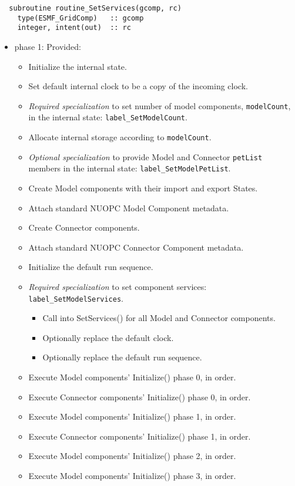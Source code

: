\begin{verbatim}  subroutine routine_SetServices(gcomp, rc)
    type(ESMF_GridComp)   :: gcomp
    integer, intent(out)  :: rc
\end{verbatim}

\begin{itemize}
\item phase 1: {\sc Provided:}
  \begin{itemize}
  \item Initialize the internal state.
  \item Set default internal clock to be a copy of the incoming clock.
  \item {\it Required specialization} to set number of model components, {\tt modelCount}, in the internal state: {\tt label\_SetModelCount}.
  \item Allocate internal storage according to {\tt modelCount}.
  \item {\it Optional specialization} to provide Model and Connector {\tt petList} members in the internal state: {\tt label\_SetModelPetList}.
  \item Create Model components with their import and export States.
  \item Attach standard NUOPC Model Component metadata.
  \item Create Connector components.
  \item Attach standard NUOPC Connector Component metadata.
  \item Initialize the default run sequence.
  \item {\it Required specialization} to set component services: {\tt label\_SetModelServices}. 
  \begin{itemize}
    \item Call into SetServices() for all Model and Connector components.
    \item Optionally replace the default clock. 
    \item Optionally replace the default run sequence.
  \end{itemize}
  \item Execute Model components' Initialize() phase 0, in order.
  \item Execute Connector components' Initialize() phase 0, in order.
  \item Execute Model components' Initialize() phase 1, in order.
  \item Execute Connector components' Initialize() phase 1, in order.
  \item Execute Model components' Initialize() phase 2, in order.
  \item Execute Model components' Initialize() phase 3, in order.
  \end{itemize}  
\end{itemize}

